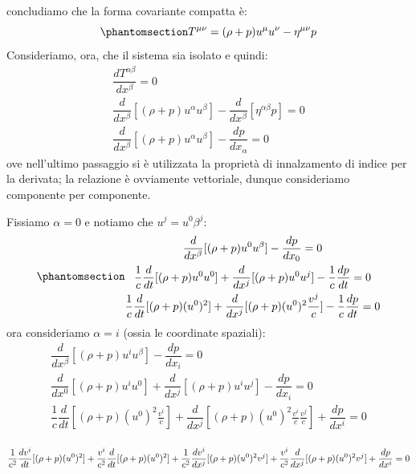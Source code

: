 concludiamo che la forma covariante compatta è:\begin{equation}\phantomsection\label{eq:tensore_fluidi}
    T^{\mu\nu}=(\rho+p)u^\mu u^\nu -\eta^{\mu\nu}p
\end{equation}
Consideriamo, ora, che il sistema sia isolato e quindi:
\begin{equation}
\begin{gathered}
    \dfrac{dT^{\alpha\beta}}{dx^\beta}=0 \\ 
    \dfrac{d}{dx^\beta}[(\rho+p)u^\alpha u^\beta]-\dfrac{d}{dx^\beta}[\eta^{\alpha\beta}p]=0\\
    \dfrac{d}{dx^\beta}[(\rho+p)u^\alpha u^\beta]-\dfrac{dp}{dx_\alpha}=0
\end{gathered}
\end{equation}
ove nell'ultimo passaggio si è utilizzata la proprietà di innalzamento di indice per la derivata; la relazione è ovviamente vettoriale, dunque consideriamo componente per componente. 

Fissiamo $\alpha=0$ e notiamo che $u^j=u^0\beta^j$:
\begin{equation}\phantomsection\label{eq:alfa_0}
\begin{gathered}
   \dfrac{d}{dx^\beta}[(\rho+p)u^0 u^\beta]-\dfrac{dp}{dx_0}=0\\
  \dfrac{1}{c} \dfrac{d}{dt}[(\rho+p)u^0 u^0]+ \dfrac{d}{dx^j}[(\rho+p)u^0 u^j]-\dfrac{1}{c}\dfrac{dp}{dt}=0\\
   \dfrac{1}{c}\dfrac{d}{dt}[(\rho+p)(u^0)^2]+ \dfrac{d}{dx^j}[(\rho+p)(u^0)^2 \frac{v^j}{c}]-\dfrac{1}{c}\dfrac{dp}{dt}=0
\end{gathered}
\end{equation}
ora consideriamo $\alpha=i$ (ossia le coordinate spaziali):
\begin{equation}
\begin{gathered}
   \dfrac{d}{dx^\beta}[(\rho+p)u^i u^\beta]-\dfrac{dp}{dx_i}=0\\
   \dfrac{d}{dx^0}[(\rho+p)u^i u^0]+\dfrac{d}{dx^j}[(\rho+p)u^i u^j]-\dfrac{dp}{dx_i}=0\\
    \dfrac{1}{c}\dfrac{d}{dt}[(\rho+p)(u^0)^2\frac{v^i}{c}]+\dfrac{d}{dx^j}[(\rho+p)(u^0)^2\frac{v^i}{c}\frac{v^j}{c}]+\dfrac{dp}{dx^i}=0\\
\end{gathered}
\end{equation}

    \begin{equation*}
          \dfrac{1}{c^2}\dfrac{dv^i}{dt}[(\rho+p)(u^0)^2]+\dfrac{v^i}{c^2}\dfrac{d}{dt}[(\rho+p)(u^0)^2]+\dfrac{1}{c^2}\dfrac{dv^i}{dx^j}[(\rho+p)(u^0)^2v^j]+\dfrac{v^i}{c^2}\dfrac{d}{dx^j}[(\rho+p)(u^0)^2v^j]+\dfrac{dp}{dx^i}=0\\
    \end{equation*}
      

